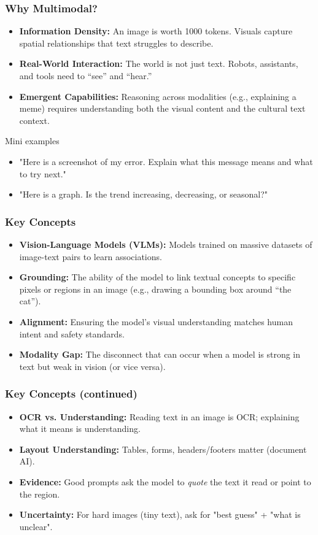 \documentclass{beamer}
\begin{document}
\begin{frame}
    \frametitle{Why Multimodal?}
    \begin{itemize}
        \item \textbf{Information Density:} An image is worth 1000 tokens. Visuals capture spatial relationships that text struggles to describe.
        \item \textbf{Real-World Interaction:} The world is not just text. Robots, assistants, and tools need to ``see'' and ``hear.''
        \item \textbf{Emergent Capabilities:} Reasoning across modalities (e.g., explaining a meme) requires understanding both the visual content and the cultural text context.
    \end{itemize}
    \begin{block}{Mini examples}
        \begin{itemize}
            \item "Here is a screenshot of my error. Explain what this message means and what to try next."
            \item "Here is a graph. Is the trend increasing, decreasing, or seasonal?"
        \end{itemize}
    \end{block}
\end{frame}

\begin{frame}
    \frametitle{Key Concepts}
    \begin{itemize}
        \item \textbf{Vision-Language Models (VLMs):} Models trained on massive datasets of image-text pairs to learn associations.
        \item \textbf{Grounding:} The ability of the model to link textual concepts to specific pixels or regions in an image (e.g., drawing a bounding box around ``the cat'').
        \item \textbf{Alignment:} Ensuring the model's visual understanding matches human intent and safety standards.
        \item \textbf{Modality Gap:} The disconnect that can occur when a model is strong in text but weak in vision (or vice versa).
    \end{itemize}
\end{frame}

\begin{frame}
    \frametitle{Key Concepts (continued)}
    \begin{itemize}
        \item \textbf{OCR vs. Understanding:} Reading text in an image is OCR; explaining what it means is understanding.
        \item \textbf{Layout Understanding:} Tables, forms, headers/footers matter (document AI).
        \item \textbf{Evidence:} Good prompts ask the model to \textit{quote} the text it read or point to the region.
        \item \textbf{Uncertainty:} For hard images (tiny text), ask for "best guess" + "what is unclear".
    \end{itemize}
\end{frame}
\end{document}
